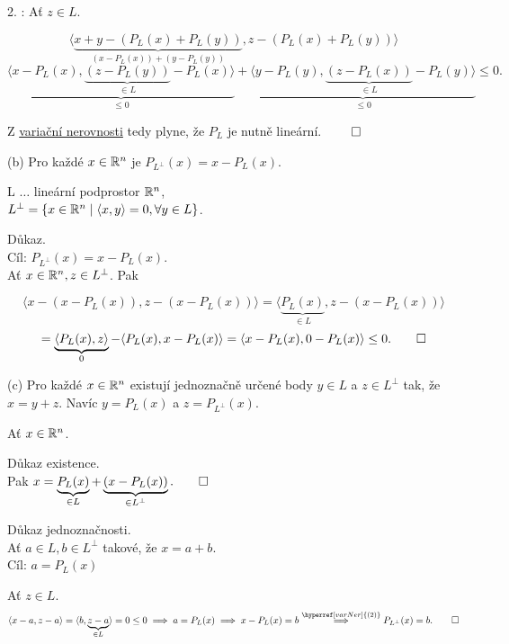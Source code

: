 2. : Ať $z \in L$.

\[
    \langle \underbrace{x + y - (P_L(x) + P_L(y))}_{(x-P_L(x)) + (y - P_L(y))}, z - (P_L (x) + P_L(y)) \rangle
\]
\[
    \underbrace{\langle x - P_L(x), \underbrace{(z - P_L(y))}_{\in L} - P_L(x)\rangle}_{\leq 0} + 
    \underbrace{\langle y - P_L(y), \underbrace{(z - P_L(x))}_{\in L}  - P_L (y)\rangle}_{\leq 0} \leq 0.
\]

Z \hyperref[varNer]{variační nerovnosti} tedy plyne, že $P_L$ je nutně lineární. $\qed$
\\

\begin{multicols}{2}
    (b) Pro každé $x \in \mathbb{R}^n$ je $P_{L^\perp} (x) = x - P_L (x)$.

    L $\dots$ lineární podprostor $\mathbb{R}^n$,\\
    $L^\perp = \left\lbrace x \in \mathbb{R}^n \mid \langle x, y\rangle = 0, \forall y \in L \right\rbrace$.

    Důkaz.\\
    Cíl: $P_{L^\perp} (x) = x - P_L(x)$.\\
    Ať $x \in \mathbb{R}^n, z \in L^\perp$. Pak

\columnbreak

\end{multicols}

\[
    \langle x - (x - P_L(x)), z - (x - P_L(x))\rangle = \langle \underbrace{P_L(x)}_{\in L}, z - (x - P_L(x))\rangle
\]
\[
    = \underbrace{\langle P_L (x), z\rangle}_0 - \langle P_L (x), x-P_L(x)\rangle = \langle x - P_L (x), 0 - P_L(x)\rangle \leq 0. \qed
\]

(c) Pro každé $x \in \mathbb{R}^n$ existují jednoznačně určené body $y \in L$ a $z \in L^\perp$ tak, že $x=y + z$. Navíc 
$y = P_L(x)$ a $z=P_{L^ \perp} (x)$.

Ať $x \in \mathbb{R}^n$.

Důkaz existence.\\
Pak  $x = \underbrace{P_L (x)}_{\in L} + \underbrace{(x - P_L (x))}_{\in L^\perp}. \qed$

Důkaz jednoznačnosti.\\
Ať $a \in L, b \in L^\perp$ takové, že $x = a+b$.\\
Cíl: $a = P_L (x)$

Ať $z \in L$.
\[
    \langle x-a, z-a\rangle = \langle b, \underbrace{z-a}_{\in L}\rangle = 0 \leq 0 \implies a = P_L (x) \implies 
    x - P_L(x) = b \stackrel{\hyperref[varNer]{(2)}}{\implies} P_{L^\perp} (x) = b. \qed
\]